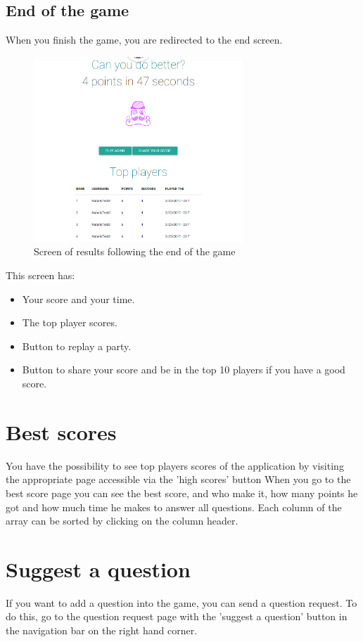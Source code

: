\documentclass[a4paper,11pt, oneside]{book}
\begin{document}
\subsection{End of the game}
When you finish the game, you are redirected to the end screen.
\begin{figure} [htbp]
	\centering
	\includegraphics[width=0.7\textwidth]{CEnd.png}
	\caption{Screen of results following the end of the game}
\end{figure}

This screen has:
\begin{itemize}
\item Your score and your time.
\item The top player scores.
\item Button to replay a party.
\item Button to share your score and be in the top 10 players if you have a good score.
\end{itemize}

\section{Best scores}
You have the possibility to see top players scores of the application by visiting the appropriate page accessible via the 'high scores' button
When you go to the best score page you can see the best score, and who make it, how many points he got and how much time he makes to answer all questions.
Each column of the array can be sorted by clicking on the column header.

\section{Suggest a question}
If you want to add a question into the game, you can send a question request.
To do this, go to the question request page with the 'suggest a question' button in the navigation bar on the right hand corner.
\end{document}
